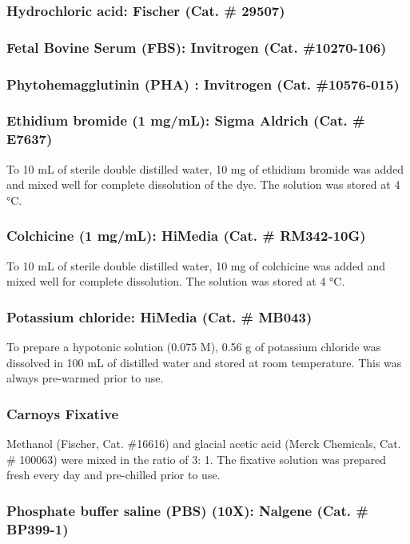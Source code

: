 \begin{refsection}
\subsubsection{Hydrochloric acid: \textmd{Fischer (Cat. \# 29507)}}
\subsubsection{Fetal Bovine Serum (FBS): \textmd{Invitrogen (Cat. \#10270-106)}} 
\subsubsection{Phytohemagglutinin (PHA) : \textmd{Invitrogen (Cat. \#10576-015)}} 
\subsubsection{Ethidium bromide (1 mg/mL): \textmd{Sigma Aldrich (Cat. \# E7637)}}
To 10 mL of sterile double distilled water, 10 mg of ethidium bromide was added and mixed well for complete dissolution of the dye. The solution was stored at 4 °C.
\subsubsection{Colchicine (1 mg/mL): \textmd{HiMedia (Cat. \# RM342-10G)}}
To 10 mL of sterile double distilled water, 10 mg of colchicine was added and mixed well for complete dissolution. The solution was stored at 4 °C.


\subsubsection{Potassium chloride: \textmd{HiMedia (Cat. \# MB043)}}
To prepare a hypotonic solution (0.075 M), 0.56 g of potassium chloride was dissolved in 100 mL of distilled water and stored at room temperature. This was always pre-warmed prior to use.
\subsubsection{Carnoys Fixative}
Methanol (Fischer, Cat. \#16616) and glacial acetic acid (Merck Chemicals, Cat. \# 100063) were mixed in the ratio of 3: 1. The fixative solution was prepared fresh every day and pre-chilled prior to use.
\subsubsection{Phosphate buffer saline (PBS) (10X): \textmd{Nalgene (Cat. \# BP399-1)}}

\end{refsection}
